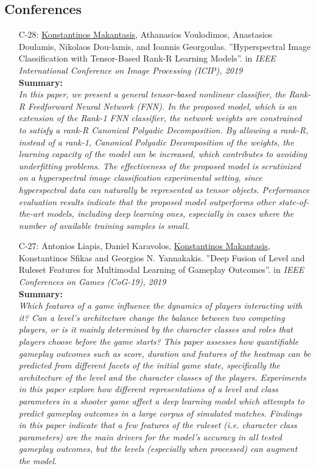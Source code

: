 \documentclass[a4paper,10pt]{article}
\begin{document}
\subsection*{Conferences}
\begin{itemize}
	\item [C-28:]\underline{Konstantinos Makantasis}, Athanasios Voulodimos, Anastasios Doulamis, Nikolaos Dou-lamis, and Ioannis Georgoulas. ''Hyperspectral Image Classification with Tensor-Based Rank-R Learning Models''. in \textit{IEEE International Conference on Image Processing (ICIP), 2019}\\
	\textbf{Summary:}\\
	\textit{In this paper, we present a general tensor-based nonlinear classifier, the Rank-R Feedforward Neural Network (FNN). In the proposed model, which is an extension of the Rank-1 FNN classifier, the network weights are constrained to satisfy a rank-R Canonical Polyadic Decomposition. By allowing a rank-R, instead of a rank-1, Canonical Polyadic Decomposition of the weights, the learning capacity of the model can be increased, which contributes to avoiding underfitting problems. The effectiveness of the proposed model is scrutinized on a hyperspectral image classification experimental setting, since hyperspectral data can naturally be represented as tensor objects.  Performance evaluation results indicate that the proposed model outperforms other state-of-the-art models, including deep learning ones, especially in cases where the number of available training samples is small. }
	
	\item [C-27:]Antonios Liapis, Daniel Karavolos, \underline{Konstantinos Makantasis}, Konstantinos Sfikas and Georgios N. Yannakakis. ''Deep Fusion of Level and Ruleset Features for Multimodal Learning of Gameplay Outcomes''. in \textit{IEEE Conferences on Games (CoG-19), 2019}\\
	\textbf{Summary:}\\
	\textit{Which features of a game influence the dynamics of players interacting with it? Can a level's architecture change the balance between two competing players, or is it mainly determined by the character classes and roles that players choose before the game starts? This paper assesses how quantifiable gameplay outcomes such as score, duration and features of the heatmap can be predicted from different facets of the initial game state, specifically the architecture of the level and the character classes of the players. Experiments in this paper explore how different representations of a level and class parameters in a shooter game affect a deep learning model which attempts to predict gameplay outcomes in a large corpus of simulated matches. Findings in this paper indicate that a few features of the ruleset (i.e. character class parameters) are the main drivers for the model's accuracy in all tested gameplay outcomes, but the levels (especially when processed) can augment the model.}
	

\end{itemize}
\end{document}
